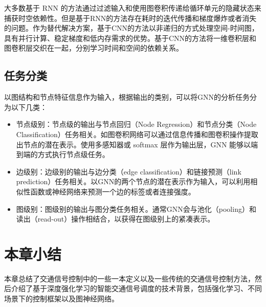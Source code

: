 大多数基于 RNN 的方法通过过滤输入和使用图卷积传递给循环单元的隐藏状态来捕获时空依赖性。但是基于RNN的方法存在耗时的迭代传播和梯度爆炸或者消失的问题。作为替代解决方案，基于CNN的方法以非递归的方式处理空间-时间图，具有并行计算、稳定梯度和低内存需求的优势。基于CNN的方法将一维卷积层和图卷积层交织在一起，分别学习时间和空间的依赖关系。

\subsection{任务分类}
以图结构和节点特征信息作为输入，根据输出的类别，可以将GNN的分析任务分为以下几类：
\begin{itemize}
\item 节点级别：节点级的输出与节点回归（Node Regression）和节点分类（Node Classification）任务相关。如图卷积网络可以通过信息传播和图卷积操作提取出节点的潜在表示。使用多感知器或 softmax 层作为输出层，GNN 能够以端到端的方式执行节点级任务。
\item 边级别：边级别的输出与边分类（edge classification）和链接预测（link prediction）任务相关。以GNN的两个节点的潜在表示作为输入，可以利用相似性函数或神经网络来预测一个边的标签或者连接强度。
\item 图级别：图级别的输出与图分类任务相关。通常GNN会与池化（pooling）和读出（read-out）操作相结合，以获得在图级别上的紧凑表示。
\end{itemize}

\section{本章小结}
本章总结了交通信号控制中的一些一本定义以及一些传统的交通信号控制方法，然后介绍了基于深度强化学习的智能交通信号调度的技术背景，包括强化学习、不同场景下的控制框架以及图神经网络。
